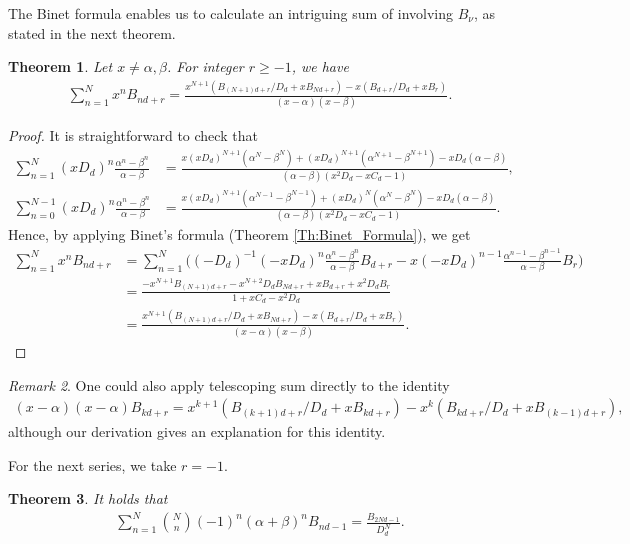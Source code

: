 \documentclass[12pt]{article}
\theoremstyle{plain}
\newtheorem{theorem}{Theorem}
\theoremstyle{definition}
\theoremstyle{remark}
\newtheorem{remark}[theorem]{Remark}
\begin{document}
The Binet formula enables us to calculate an intriguing sum of involving $ B_\nu $, as stated in the next theorem. 	
\begin{theorem} Let $ x \neq \alpha, \beta $. For integer $ r \geq -1 $, we have 
\begin{align*}
	\sum_{n = 1}^N x^n B_{nd + r} = \frac{x^{N + 1} (B_{(N + 1)d + r}/D_d + x B_{Nd + r}) - x(B_{d + r}/D_d + x B_r)}{(x - \alpha)(x - \beta)}.
\end{align*}
\end{theorem}

\begin{proof} It is straightforward to check that
\begin{align*}
	\sum_{n = 1}^N (x D_d)^n \frac{\alpha^n - \beta^n}{\alpha - \beta} &= \frac{x(xD_d)^{N + 1} (\alpha^N - \beta^N) + (xD_d)^{N + 1} (\alpha^{N + 1} - \beta^{N + 1}) - xD_d (\alpha - \beta)}{(\alpha - \beta) (x^2 D_d - xC_d - 1)}, \\	
	\sum_{n = 0}^{N - 1} (x D_d)^n \frac{\alpha^n - \beta^n}{\alpha - \beta} &= \frac{x(xD_d)^{N + 1} (\alpha^{N - 1} - \beta^{N - 1}) + (xD_d)^N (\alpha^N - \beta^N) - xD_d (\alpha - \beta)}{(\alpha - \beta) (x^2 D_d - xC_d - 1)}.
\end{align*}
Hence, by applying Binet's formula (Theorem \ref{Th:Binet_Formula}), we get
\begin{align*}
	\sum_{n = 1}^N x^n B_{nd + r} &= \sum_{n = 1}^N \bigg((-D_d)^{-1} (-x D_d)^n \frac{\alpha^n - \beta^n}{\alpha - \beta} B_{d + r} - x (-x D_d)^{n - 1} \frac{\alpha^{n - 1} - \beta^{n - 1}}{\alpha - \beta} B_r \bigg) \\
	&= \frac{-x^{N + 1} B_{(N + 1)d + r} - x^{N + 2} D_d B_{Nd + r} + xB_{d + r} + x^2 D_d B_r}{1 + xC_d - x^2 D_d} \\
	&= \frac{x^{N + 1} (B_{(N + 1)d + r}/D_d + x B_{Nd + r}) - x(B_{d + r}/D_d + x B_r)}{(x - \alpha)(x - \beta)}.
\end{align*}
\end{proof}

\begin{remark} One could also apply telescoping sum directly to the identity
\begin{align*}
	(x - \alpha)(x - \alpha) B_{kd + r} = x^{k + 1} (B_{(k + 1)d + r}/D_d + xB_{kd +r}) - x^k (B_{kd + r}/D_d + xB_{(k - 1)d +r}),
\end{align*}
although our derivation gives an explanation for this identity.
\end{remark}

For the next series, we take $ r = -1 $. 
\begin{theorem} It holds that
\begin{align*}
	\sum_{n = 1}^N \binom{N}{n} (-1)^n (\alpha + \beta)^n B_{nd - 1} =  \frac{B_{2Nd - 1}}{D_d^N}.
\end{align*}
\end{theorem}
\end{document}

